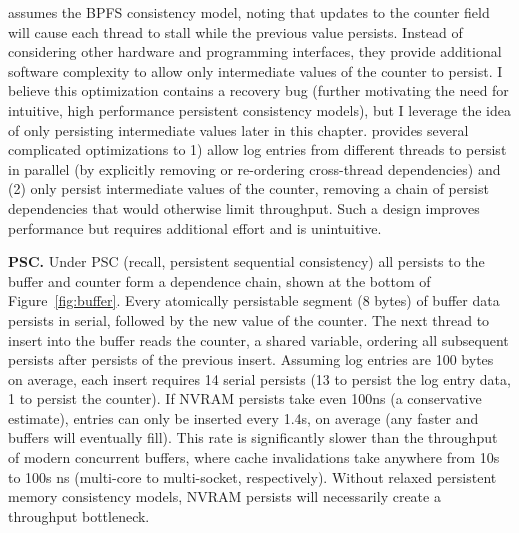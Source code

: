 \cite{FangHsiao11} assumes the BPFS consistency model, noting that updates to the counter field will cause each thread to stall while the previous value persists.
Instead of considering other hardware and programming interfaces, they provide additional software complexity to allow only intermediate values of the counter to persist.
I believe this optimization contains a recovery bug (further motivating the need for intuitive, high performance persistent consistency models), but I leverage the idea of only persisting intermediate values later in this chapter.
\cite{FangHsiao11} provides several complicated optimizations to 1) allow log entries from different threads to persist in parallel (by explicitly removing or re-ordering cross-thread dependencies) and (2) only persist intermediate values of the counter, removing a chain of persist dependencies that would otherwise limit throughput.
Such a design improves performance but requires additional effort and is unintuitive.

\textbf{PSC.} Under PSC (recall, persistent sequential consistency) all persists to the buffer and counter form a dependence chain, shown at the bottom of Figure~\ref{fig:buffer}.
Every atomically persistable segment (8 bytes) of buffer data persists in serial, followed by the new value of the counter.
The next thread to insert into the buffer reads the counter, a shared variable, ordering all subsequent persists after persists of the previous insert.
Assuming log entries are 100 bytes on average, each insert requires 14 serial persists (13 to persist the log entry data, 1 to persist the counter).
If NVRAM persists take even 100ns (a conservative estimate), entries can only be inserted every 1.4\textmu s, on average (any faster and buffers will eventually fill).
This rate is significantly slower than the throughput of modern concurrent buffers, where cache invalidations take anywhere from 10s to 100s ns (multi-core to multi-socket, respectively).
Without relaxed persistent memory consistency models, NVRAM persists will necessarily create a throughput bottleneck.

